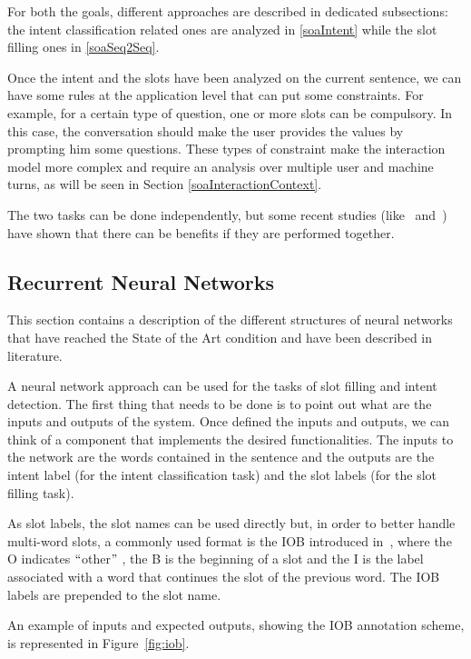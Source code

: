 For both the goals, different approaches are described in dedicated subsections: the intent classification related ones are analyzed in \ref{soaIntent} while the slot filling ones in \ref{soaSeq2Seq}.

Once the intent and the slots have been analyzed on the current sentence, we can have some rules at the application level that can put some constraints. For example, for a certain type of question, one or more slots can be compulsory. In this case, the conversation should make the user provides the values by prompting him some questions. These types of constraint make the interaction model more complex and require an analysis over multiple user and machine turns, as will be seen in Section \ref{soaInteractionContext}.

The two tasks can be done independently, but some recent studies (like~\cite{guo2014joint} and~\cite{liu2016attention}) have shown that there can be benefits if they are performed together.

\subsection{Recurrent Neural Networks}
This section contains a description of the different structures of neural networks that have reached the State of the Art condition and have been described in literature.

A neural network approach can be used for the tasks of slot filling and intent detection. The first thing that needs to be done is to point out what are the inputs and outputs of the system. Once defined the inputs and outputs, we can think of a component that implements the desired functionalities. The inputs to the network are the words contained in the sentence and the outputs are the intent label (for the intent classification task) and the slot labels (for the slot filling task).

As slot labels, the slot names can be used directly but, in order to better handle multi-word slots, a commonly used format is the IOB introduced in~\cite{ramshaw1999text}, where the O indicates $``$other$"$ , the B is the beginning of a slot and the I is the label associated with a word that continues the slot of the previous word. The IOB labels are prepended to the slot name.

An example of inputs and expected outputs, showing the IOB annotation scheme, is represented in Figure~\ref{fig:iob}.


